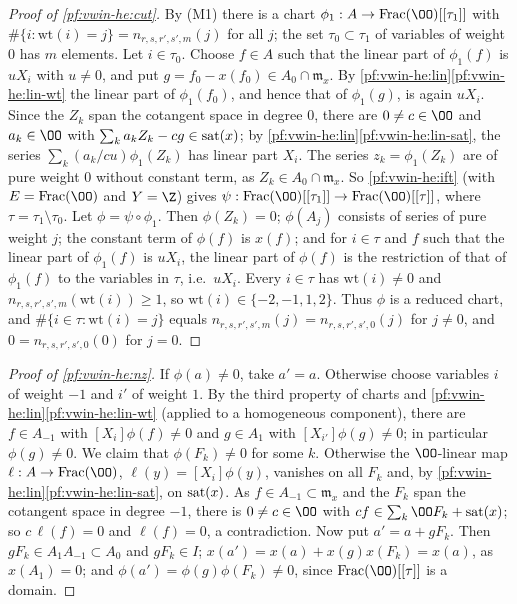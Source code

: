 \begin{proof}[Proof of \cref{pf:vwin-he:cut}]
By (M1) there is a chart $\phi_1:A\to\mathrm{Frac}(\OO)[[\tau_1]]$ with $\#\{i:\mathrm{wt}(i)=j\}=n_{r,s,r',s',m}(j)$
for all $j$; the set $\tau_0\subset\tau_1$ of variables of weight $0$ has $m$ elements. Let $i\in\tau_0$. Choose
$f\in A$ such that the linear part of $\phi_1(f)$ is $uX_i$ with $u\ne0$, and put $g=f_0-x(f_0)\in A_0\cap\mathfrak
m_x$. By \cref{pf:vwin-he:lin}\ref{pf:vwin-he:lin-wt} the linear part of $\phi_1(f_0)$, and hence that of
$\phi_1(g)$, is again $uX_i$. Since the $Z_k$ span the cotangent space in degree $0$, there are $0\ne c\in\OO$ and
$a_k\in\OO$ with $\sum_ka_kZ_k-cg\in\operatorname{sat}(x)$; by \cref{pf:vwin-he:lin}\ref{pf:vwin-he:lin-sat}, the series
$\sum_k(a_k/cu)\phi_1(Z_k)$ has linear part $X_i$. The series $z_k=\phi_1(Z_k)$ are of pure weight $0$ without
constant term, as $Z_k\in A_0\cap\mathfrak m_x$. So \cref{pf:vwin-he:ift} (with $E=\mathrm{Frac}(\OO)$ and $Y=\Z$)
gives $\psi:\mathrm{Frac}(\OO)[[\tau_1]]\to\mathrm{Frac}(\OO)[[\tau]]$, where $\tau=\tau_1\setminus\tau_0$. Let
$\phi=\psi\circ\phi_1$. Then $\phi(Z_k)=0$; $\phi(A_j)$ consists of series of pure weight $j$; the constant term of
$\phi(f)$ is $x(f)$; and for $i\in\tau$ and $f$ such that the linear part of $\phi_1(f)$ is $uX_i$, the linear part of
$\phi(f)$ is the restriction of that of $\phi_1(f)$ to the variables in $\tau$, i.e.\ $uX_i$. Every $i\in\tau$ has
$\mathrm{wt}(i)\ne0$ and $n_{r,s,r',s',m}(\mathrm{wt}(i))\ge1$, so $\mathrm{wt}(i)\in\{-2,-1,1,2\}$. Thus $\phi$ is a
reduced chart, and $\#\{i\in\tau:\mathrm{wt}(i)=j\}$ equals $n_{r,s,r',s',m}(j)=n_{r,s,r',s',0}(j)$ for $j\ne0$, and
$0=n_{r,s,r',s',0}(0)$ for $j=0$.
\end{proof}

\begin{proof}[Proof of \cref{pf:vwin-he:nz}]
If $\phi(a)\ne0$, take $a'=a$. Otherwise choose variables $i$ of weight $-1$ and $i'$ of weight $1$. By the third
property of charts and \cref{pf:vwin-he:lin}\ref{pf:vwin-he:lin-wt} (applied to a homogeneous component), there are
$f\in A_{-1}$ with $[X_i]\phi(f)\ne0$ and $g\in A_1$ with $[X_{i'}]\phi(g)\ne0$; in particular $\phi(g)\ne0$. We
claim that $\phi(F_k)\ne0$ for some $k$. Otherwise the $\OO$-linear map $\ell:A\to\mathrm{Frac}(\OO)$,
$\ell(y)=[X_i]\phi(y)$, vanishes on all $F_k$ and, by \cref{pf:vwin-he:lin}\ref{pf:vwin-he:lin-sat}, on
$\operatorname{sat}(x)$. As $f\in A_{-1}\subset\mathfrak m_x$ and the $F_k$ span the cotangent space in degree $-1$, there is
$0\ne c\in\OO$ with $cf\in\sum_k\OO F_k+\vwinhesat(x)$; so $c\,\ell(f)=0$ and $\ell(f)=0$, a contradiction. Now put
$a'=a+gF_k$. Then $gF_k\in A_1A_{-1}\subset A_0$ and $gF_k\in I$; $x(a')=x(a)+x(g)x(F_k)=x(a)$, as $x(A_1)=0$; and
$\phi(a')=\phi(g)\phi(F_k)\ne0$, since $\mathrm{Frac}(\OO)[[\tau]]$ is a domain.
\end{proof}

